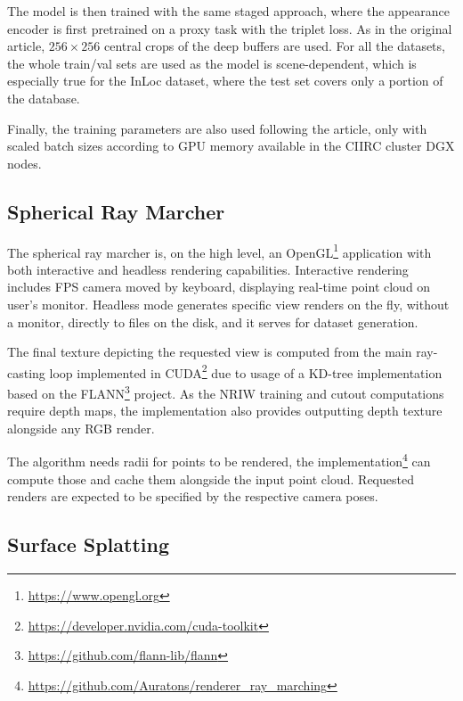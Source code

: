 The model is then trained with the same staged approach, where the appearance encoder is
first pretrained on a proxy task with the triplet loss. As in the original article,
$256\times256$ central crops of the deep buffers are used. For all the datasets, the whole
train/val sets are used as the model is scene-dependent, which is especially true for the
InLoc dataset, where the test set covers only a portion of the database.

Finally, the training parameters are also used following the article, only with scaled
batch sizes according to GPU memory available in the CIIRC cluster DGX nodes.

\subsection{Spherical Ray Marcher}

The spherical ray marcher is, on the high level, an
OpenGL\footnote{\url{https://www.opengl.org}} application with both interactive and
headless rendering capabilities. Interactive rendering includes FPS camera moved by
keyboard, displaying real-time point cloud on user's monitor.  Headless mode generates
specific view renders on the fly, without a monitor, directly to files on the disk, and it
serves for dataset generation.

The final texture depicting the requested view is computed from the main ray-casting loop
implemented in CUDA\footnote{\url{https://developer.nvidia.com/cuda-toolkit}} due to usage
of a KD-tree implementation based on the
FLANN\footnote{\url{https://github.com/flann-lib/flann}} project. As the NRIW training and
cutout computations require depth maps, the implementation also provides outputting depth
texture alongside any RGB render.

The algorithm needs radii for points to be rendered, the
implementation\footnote{\url{https://github.com/Auratons/renderer_ray_marching}} can
compute those and cache them alongside the input point cloud.  Requested renders are
expected to be specified by the respective camera poses.


\subsection{Surface Splatting}

